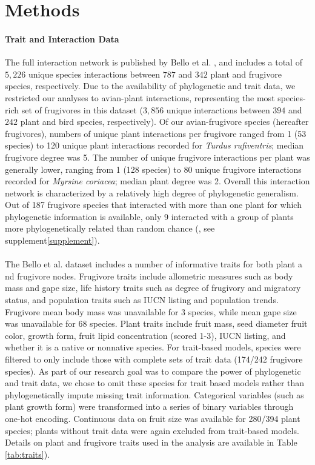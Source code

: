 \documentclass[num-refs]{wiley-article}%
\begin{document}
\section*{Methods}

\paragraph{Trait and Interaction Data}
The full interaction network is published by Bello et al. \cite{bello2017}, and includes a total of $5,226$ unique species interactions between $787$ and $342$ plant and frugivore species, respectively. Due to the availability of phylogenetic and trait data, we restricted our analyses to avian-plant interactions, representing the most species-rich set of frugivores in this dataset ($3,856$ unique interactions between $394$ and $242$ plant and bird species, respectively). Of our avian-frugivore species (hereafter frugivores), numbers of unique plant interactions per frugivore ranged from 1 (53 species) to 120 unique plant interactions recorded for \emph{Turdus rufiventris}; median frugivore degree was 5. The number of unique frugivore interactions per plant was generally lower, ranging from 1 (128 species) to 80 unique frugivore interactions recorded for \emph{Myrsine coriacea}; median plant degree was 2. Overall this interaction network is characterized by a relatively high degree of phylogenetic generalism. Out of 187 frugivore species that interacted with more than one plant for which phylogenetic information is available, only 9 interacted with a group of plants more phylogenetically related than random chance (\cite{kembel2010picante}, see supplement\ref{supplement}). 

\paragraph*{}
The Bello et al. dataset includes a number of informative traits for both plant a   nd frugivore nodes. Frugivore traits include allometric measures such as body mass and gape size, life history traits such as degree of frugivory and migratory status, and population traits such as  IUCN listing and population trends. Frugivore mean body mass was unavailable for 3 species, while mean gape size was unavailable for 68 species. Plant traits include fruit mass, seed diameter fruit color, growth form, fruit lipid concentration (scored 1-3), IUCN listing, and whether it is a native or nonnative species. For trait-based models, species were filtered to only include those with complete sets of trait data (174/242 frugivore species). As part of our research goal was to compare the power of phylogenetic and trait data, we chose to omit these species for trait based models rather than phylogenetically impute missing trait information. Categorical variables (such as plant growth form) were transformed into a series of binary variables through one-hot encoding. Continuous data on fruit size was available for 280/394 plant species; plants without trait data were again excluded from trait-based models. Details on plant and frugivore traits used in the analysis are available in Table \ref{tab:traits}). 
    
\end{document}
